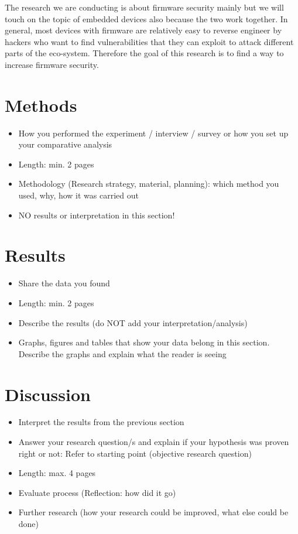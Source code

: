 \documentclass[]{report}
\begin{document}
The research we are conducting is about firmware security mainly but we will touch on the topic of embedded devices also because the two work together. In general, most devices with firmware are relatively easy to reverse engineer by hackers who want to find vulnerabilities that they can exploit to attack different parts of the eco-system. Therefore the goal of this research is to find a way to increase firmware security.

\section{Methods}
\begin{itemize}
	\item How you performed the experiment / interview / survey or how you set up your comparative analysis
	\item Length: min. 2 pages
	\item Methodology (Research strategy, material, planning): which method you used, why, how it was carried out
	\item NO results or interpretation in this section!
\end{itemize}


\section{Results}
\begin{itemize}
	\item Share the data you found
	\item Length: min. 2 pages
	\item Describe the results (do NOT add your interpretation/analysis)
	\item Graphs, figures and tables that show your data belong in this section. Describe the graphs and explain what the reader is seeing

\end{itemize}

	
\section{Discussion}
\begin{itemize}
	\item Interpret the results from the previous section
	\item Answer your research question/s and explain if your hypothesis was proven right or not: Refer to starting point (objective research question)

	\item Length: max. 4 pages
	\item Evaluate process (Reflection: how did it go)
	\item Further research (how your research could be improved, what else could be done)
\end{itemize}
\end{document}
